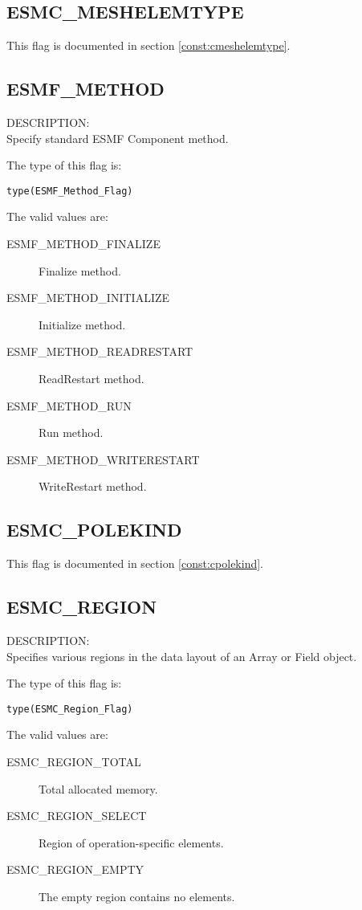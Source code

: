 \subsection{ESMC\_MESHELEMTYPE}
This flag is documented in section \ref{const:cmeshelemtype}.

\subsection{ESMF\_METHOD}
\label{const:cmethod}

{\sf DESCRIPTION:\\}  
Specify standard ESMF Component method.

The type of this flag is:

{\tt type(ESMF\_Method\_Flag)}

The valid values are:
\begin{description}
\item [ESMF\_METHOD\_FINALIZE]
      Finalize method.
\item [ESMF\_METHOD\_INITIALIZE]
      Initialize method.
\item [ESMF\_METHOD\_READRESTART]
      ReadRestart method.
\item [ESMF\_METHOD\_RUN]
      Run method.
\item [ESMF\_METHOD\_WRITERESTART]
      WriteRestart method.
\end{description}

\subsection{ESMC\_POLEKIND}
This flag is documented in section \ref{const:cpolekind}.

\subsection{ESMC\_REGION}
\label{const:cregion}
{\sf DESCRIPTION:\\}
Specifies various regions in the data layout of an Array or Field object.

The type of this flag is:

{\tt type(ESMC\_Region\_Flag)}

The valid values are:
\begin{description}
\item [ESMC\_REGION\_TOTAL]
      Total allocated memory.
\item [ESMC\_REGION\_SELECT]
      Region of operation-specific elements.
\item [ESMC\_REGION\_EMPTY]
      The empty region contains no elements.
\end{description}

